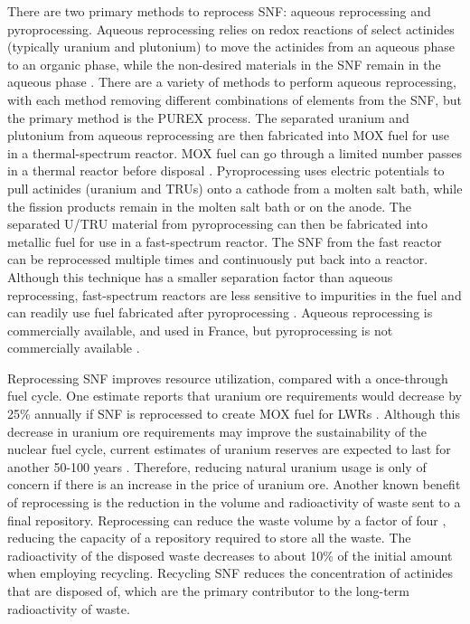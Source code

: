 There are two primary methods to reprocess \gls{SNF}: aqueous reprocessing 
and pyroprocessing. Aqueous reprocessing relies on redox reactions of 
select actinides (typically uranium and plutonium) to move the 
actinides from an aqueous phase to an organic phase, while the non-desired 
materials in the \gls{SNF} remain in the aqueous phase \cite{rodriguez-penalonga_review_2017}. 
There 
are a variety of methods to perform aqueous reprocessing, with each method 
removing different combinations of elements from the \gls{SNF}, but the primary 
method is the PUREX process. The separated uranium and plutonium from 
aqueous reprocessing are then fabricated into \gls{MOX} fuel for use in 
a thermal-spectrum reactor. \gls{MOX} fuel can go through a limited number 
passes in a thermal reactor before disposal \cite{rodriguez-penalonga_review_2017}.
Pyroprocessing uses electric potentials to 
pull actinides (uranium and 
\glspl{TRU}) onto a cathode from a molten salt bath, while the fission products
remain in the molten salt bath or on the anode. The 
separated U/\gls{TRU} material from pyroprocessing can then be fabricated 
into metallic fuel for use in a fast-spectrum reactor. 
The \gls{SNF} from 
the fast reactor can be reprocessed multiple times and continuously put back 
into a reactor. Although this technique 
has a smaller separation factor than aqueous reprocessing, fast-spectrum 
reactors are less sensitive to impurities in the fuel and can readily use 
fuel fabricated after pyroprocessing \cite{rodriguez-penalonga_review_2017}.
Aqueous reprocessing is commercially available, and used in 
France, but pyroprocessing is not commercially available 
\cite{rodriguez-penalonga_review_2017,noauthor_status_2021}. 

Reprocessing \gls{SNF} improves resource utilization, compared 
with a once-through fuel cycle. One estimate reports that uranium ore
requirements would decrease by 25\% annually if \gls{SNF} is reprocessed 
to create \gls{MOX} fuel for \glspl{LWR} \cite{widder_benefits_2010}. 
Although this decrease in uranium ore requirements may improve the 
sustainability of the nuclear fuel cycle, current estimates of uranium 
reserves are expected to last for another 50-100 years 
\cite{widder_benefits_2010}. Therefore, reducing natural uranium usage  
is only of concern 
if there is an increase in the price of uranium ore. Another known benefit 
of reprocessing is the reduction in the volume and radioactivity of 
waste sent to a final repository. Reprocessing can reduce the waste 
volume by a factor of four \cite{widder_benefits_2010}, 
reducing the capacity of a repository required to store all the 
waste.
The radioactivity of the disposed waste decreases to about 10\% of the 
initial amount \cite{rodriguez-penalonga_review_2017} when employing 
recycling. Recycling \gls{SNF} reduces the concentration of actinides 
that are disposed of, which are the primary contributor to the long-term 
radioactivity of waste. 

